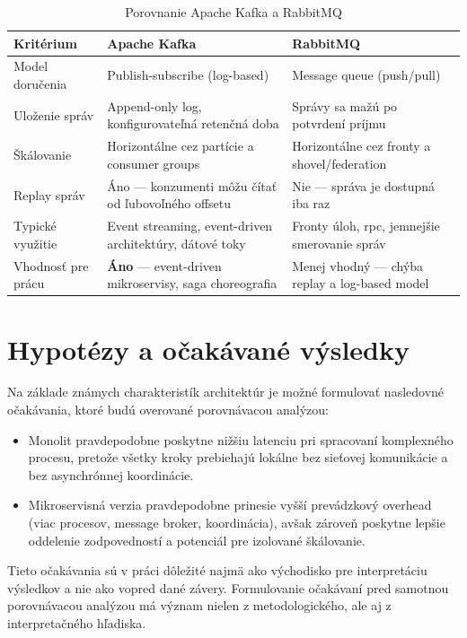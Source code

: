 \begin{table}[H]
\centering
\begin{tabular}{|p{}|p{}|p{}|}
\hline
\textbf{Kritérium} & \textbf{Apache Kafka} & \textbf{RabbitMQ} \\ \hline
Model doručenia   & Publish-subscribe (log-based) & Message queue (push/pull) \\ \hline
Uloženie správ    & Append-only log, konfigurovateľná retenčná doba & Správy sa mažú po potvrdení príjmu \\ \hline
Škálovanie        & Horizontálne cez partície a consumer groups & Horizontálne cez fronty a shovel/federation \\ \hline
Replay správ      & Áno — konzumenti môžu čítať od ľubovoľného offsetu & Nie — správa je dostupná iba raz \\ \hline
Typické využitie  & Event streaming, event-driven architektúry, dátové toky & Fronty úloh, \gls{rpc}, jemnejšie smerovanie správ \\ \hline
Vhodnosť pre prácu & \textbf{Áno} — event-driven mikroservisy, saga choreografia & Menej vhodný — chýba replay a log-based model \\ \hline
\end{tabular}
\caption{Porovnanie Apache Kafka a RabbitMQ}
\label{tab:kafka-vs-rabbitmq}
\end{table}

\section{Hypotézy a očakávané výsledky}

Na základe známych charakteristík architektúr je možné formulovať nasledovné očakávania, ktoré budú overované porovnávacou analýzou:

\begin{itemize}
    \item Monolit pravdepodobne poskytne nižšiu latenciu pri spracovaní komplexného procesu, pretože všetky kroky prebiehajú lokálne bez sieťovej komunikácie a bez asynchrónnej koordinácie.
    \item Mikroservisná verzia pravdepodobne prinesie vyšší prevádzkový overhead (viac procesov, message broker, koordinácia), avšak zároveň poskytne lepšie oddelenie zodpovedností a potenciál pre izolované škálovanie.
\end{itemize}

Tieto očakávania sú v práci dôležité najmä ako východisko pre interpretáciu výsledkov a nie ako vopred dané závery. Formulovanie očakávaní pred samotnou porovnávacou analýzou má význam nielen z metodologického, ale aj z interpretačného hľadiska.

